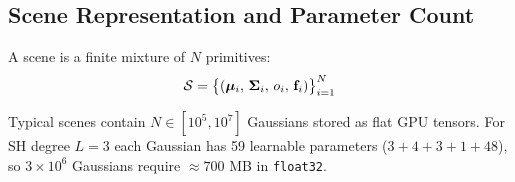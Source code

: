 \subsection{Scene Representation and Parameter Count}

A scene is a finite mixture of $N$ primitives:
\begin{equation}
  \mathcal{S} = \bigl\{ (\boldsymbol{\mu}_i,\, \boldsymbol{\Sigma}_i,\, o_i,\, \mathbf{f}_i) \bigr\}_{i=1}^{N}
\end{equation}

Typical scenes contain $N \in [10^5, 10^7]$ Gaussians stored as flat GPU
tensors. For SH degree $L=3$ each Gaussian has 59 learnable parameters
($3 + 4 + 3 + 1 + 48$), so $3\times10^6$ Gaussians require $\approx700$ MB in
\texttt{float32}.
